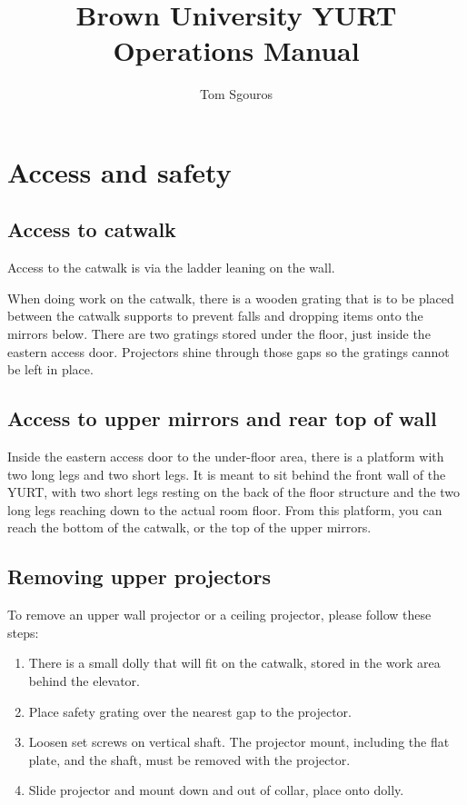 \documentclass[11pt]{article}
\newcommand{\yurt}{YURT\xspace}
\begin{document}
\title{Brown University YURT Operations Manual}
\author{Tom Sgouros}
\maketitle

\tableofcontents

\setlength{\parskip}{10pt}
\setlength{\parindent}{0pt}

\section{Access and safety}

\subsection{Access to catwalk}

Access to the catwalk is via the ladder leaning on the wall.

When doing work on the catwalk, there is a wooden grating that is to
be placed between the catwalk supports to prevent falls and dropping
items onto the mirrors below.  There are two gratings stored under the
floor, just inside the eastern access door.  Projectors shine through
those gaps so the gratings cannot be left in place.

\subsection{Access to upper mirrors and rear top of wall}

Inside the eastern access door to the under-floor area, there is a
platform with two long legs and two short legs. It is meant to sit
behind the front wall of the \yurt, with two short legs resting on the
back of the floor structure and the two long legs reaching down to the
actual room floor.  From this platform, you can reach the bottom of
the catwalk, or the top of the upper mirrors.

\subsection{Removing upper projectors}

To remove an upper wall projector or a ceiling projector, please
follow these steps:

\begin{enumerate}
\item There is a small dolly that will fit on the catwalk, stored in
  the work area behind the elevator.

\item Place safety grating over the nearest gap to the projector.

\item Loosen set screws on vertical shaft.  The projector mount,
  including the flat plate, and the shaft, must be removed with the
  projector.

\item Slide projector and mount down and out of collar, place onto
  dolly.
\end{enumerate}
\end{document}
